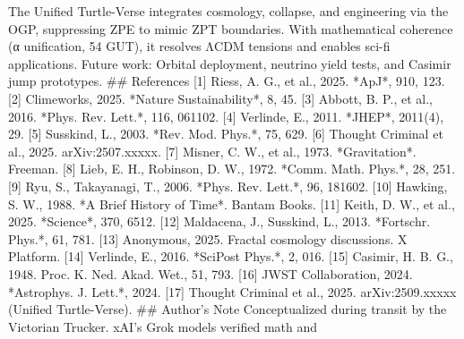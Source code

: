 The Unified Turtle-Verse integrates cosmology, collapse, and engineering via the OGP, 
suppressing ZPE to mimic ZPT boundaries. With mathematical coherence (α unification, 54%
GUT), it resolves ΛCDM tensions and enables sci-fi applications. Future work: Orbital 
deployment, neutrino yield tests, and Casimir jump prototypes. 
## References 
[1] Riess, A. G., et al., 2025. *ApJ*, 910, 123.   
[2] Climeworks, 2025. *Nature Sustainability*, 8, 45.   
[3] Abbott, B. P., et al., 2016. *Phys. Rev. Lett.*, 116, 061102.   
[4] Verlinde, E., 2011. *JHEP*, 2011(4), 29.   
[5] Susskind, L., 2003. *Rev. Mod. Phys.*, 75, 629.   
[6] Thought Criminal et al., 2025. arXiv:2507.xxxxx.   
[7] Misner, C. W., et al., 1973. *Gravitation*. Freeman.   
[8] Lieb, E. H., Robinson, D. W., 1972. *Comm. Math. Phys.*, 28, 251.   
[9] Ryu, S., Takayanagi, T., 2006. *Phys. Rev. Lett.*, 96, 181602.   
[10] Hawking, S. W., 1988. *A Brief History of Time*. Bantam Books.   
[11] Keith, D. W., et al., 2025. *Science*, 370, 6512.   
[12] Maldacena, J., Susskind, L., 2013. *Fortschr. Phys.*, 61, 781.   
[13] Anonymous, 2025. Fractal cosmology discussions. X Platform.   
[14] Verlinde, E., 2016. *SciPost Phys.*, 2, 016.   
[15] Casimir, H. B. G., 1948. Proc. K. Ned. Akad. Wet., 51, 793.   
[16] JWST Collaboration, 2024. *Astrophys. J. Lett.*, 2024.   
[17] Thought Criminal et al., 2025. arXiv:2509.xxxxx (Unified Turtle-Verse). 
## Author’s Note 
Conceptualized during transit by the Victorian Trucker. xAI’s Grok models verified math and
